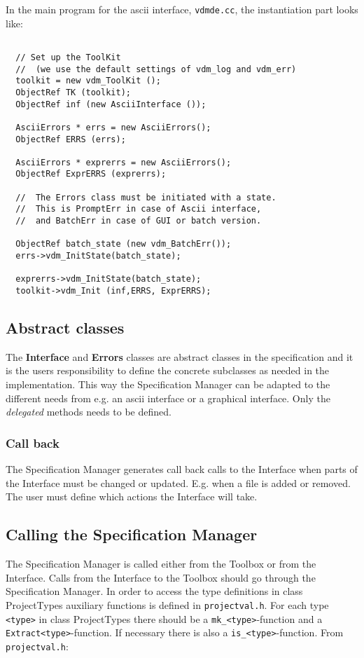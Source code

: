 \documentclass[11pt]{article}
\newcommand{\specman} {Specification Manager}
\begin{document}
In the main program for the ascii interface, \texttt{vdmde.cc}, the
instantiation part looks like:
\begin{verbatim}
  
  // Set up the ToolKit
  //  (we use the default settings of vdm_log and vdm_err)
  toolkit = new vdm_ToolKit ();
  ObjectRef TK (toolkit);
  ObjectRef inf (new AsciiInterface ());

  AsciiErrors * errs = new AsciiErrors();
  ObjectRef ERRS (errs);

  AsciiErrors * exprerrs = new AsciiErrors();
  ObjectRef ExprERRS (exprerrs);

  //  The Errors class must be initiated with a state.
  //  This is PromptErr in case of Ascii interface,
  //  and BatchErr in case of GUI or batch version.
    
  ObjectRef batch_state (new vdm_BatchErr());
  errs->vdm_InitState(batch_state);
  
  exprerrs->vdm_InitState(batch_state);
  toolkit->vdm_Init (inf,ERRS, ExprERRS);
\end{verbatim}

\subsection{Abstract classes}

The \textbf{Interface} and \textbf{Errors} classes are abstract
classes in the specification and it is the users responsibility to
define the concrete subclasses as needed in the implementation. This
way the \specman{} can be adapted to the different needs from e.g. an
ascii interface or a graphical interface.  Only the \textit{delegated}
methods needs to be defined.

\subsubsection{Call back}

The \specman{} generates call back calls to the Interface when parts
of the Interface must be changed or updated. E.g. when a file is added
or removed. The user must define which actions the Interface will
take. 

\subsection{Calling the \specman}
\label{sec:call}

The \specman{} is called either from the Toolbox or from the
Interface. Calls from the Interface to the Toolbox should go through
the \specman{}. In order to access the type definitions in class
ProjectTypes auxiliary functions is defined in
\texttt{projectval.h}. For each type \texttt{<type>} in class
ProjectTypes there should be a \texttt{mk\_<type>}-function and a
\texttt{Extract<type>}-function. If necessary there is also a
\texttt{is\_<type>}-function. From \texttt{projectval.h}:
\end{document}
